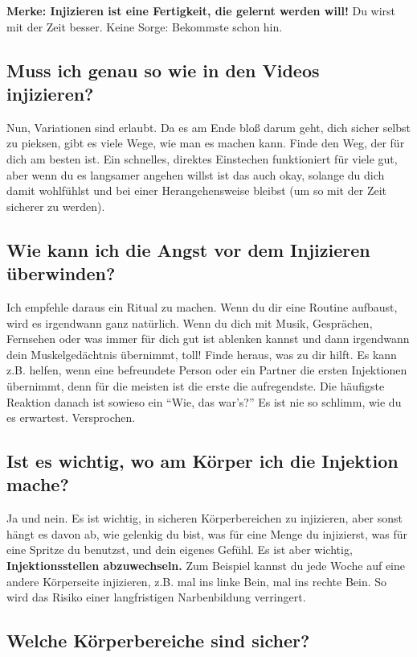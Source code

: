 \documentclass{article}
\begin{document}
\textbf{Merke: Injizieren ist eine Fertigkeit, die gelernt werden will!} Du wirst mit der Zeit besser. Keine Sorge: Bekommste schon hin.

\subsection{Muss ich genau so wie in den Videos injizieren?}

Nun, Variationen sind erlaubt. Da es am Ende bloß darum geht, dich sicher selbst zu pieksen, gibt es viele Wege, wie man es machen kann. Finde den Weg, der für dich am besten ist. Ein schnelles, direktes Einstechen funktioniert für viele gut, aber wenn du es langsamer angehen willst ist das auch okay, solange du dich damit wohlfühlst und bei einer Herangehensweise bleibst (um so mit der Zeit sicherer zu werden).

\subsection{Wie kann ich die Angst vor dem Injizieren überwinden?}

Ich empfehle daraus ein Ritual zu machen. Wenn du dir eine Routine aufbaust, wird es irgendwann ganz natürlich. Wenn du dich mit Musik, Gesprächen, Fernsehen oder was immer für dich gut ist ablenken kannst und dann irgendwann dein Muskelgedächtnis übernimmt, toll! Finde heraus, was zu dir hilft. Es kann z.B. helfen, wenn eine befreundete Person oder ein Partner die ersten Injektionen übernimmt, denn für die meisten ist die erste die aufregendste. Die häufigste Reaktion danach ist sowieso ein “Wie, das war's?” Es ist nie so schlimm, wie du es erwartest. Versprochen.

\subsection{Ist es wichtig, wo am Körper ich die Injektion mache?}

Ja und nein. Es ist wichtig, in sicheren Körperbereichen zu injizieren, aber sonst hängt es davon ab, wie gelenkig du bist, was für eine Menge du injizierst, was für eine Spritze du benutzst, und dein eigenes Gefühl. Es ist aber wichtig, \textbf{Injektionsstellen abzuwechseln.} Zum Beispiel kannst du jede Woche auf eine andere Körperseite injizieren, z.B. mal ins linke Bein, mal ins rechte Bein. So wird das Risiko einer langfristigen Narbenbildung verringert.

\subsection{Welche Körperbereiche sind sicher?}
\end{document}
